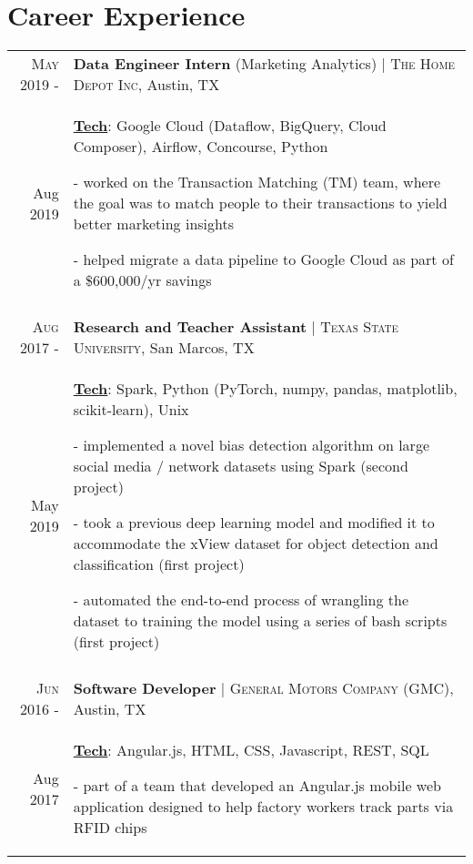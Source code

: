 \documentclass[a4paper,10pt]{article}
\begin{document}
\section{Career Experience}
\begin{tabular}{r|p{12cm}}

\textsc{May 2019 -} & \textbf{Data Engineer Intern} (Marketing Analytics) | \textsc{The Home Depot Inc}, Austin, TX \\
Aug 2019 & \small{
	\textbf{\underline{Tech}}: Google Cloud (Dataflow, BigQuery, Cloud Composer), Airflow, Concourse, Python}

	\tiny{
	\vphantom{a}
	}
	
	\small{
	- worked on the Transaction Matching (TM) team, where the goal was to match people to their transactions to yield better marketing insights
	
	- helped migrate a data pipeline to Google Cloud as part of a \$600,000/yr savings } \\
 \multicolumn{2}{c}{} \\

\textsc{Aug 2017 -} & \textbf{Research and Teacher Assistant} | \textsc{Texas State University}, San Marcos, TX \\
May 2019 & \small{
	\textbf{\underline{Tech}}: Spark, Python (PyTorch, numpy, pandas, matplotlib, scikit-learn), Unix
	}

	\tiny{
	\vphantom{a}
	}

	\small{
	
	- implemented a novel bias detection algorithm on large social media / network datasets using Spark (second project)
	
	- took a previous deep learning model and modified it to accommodate the xView dataset for object detection and classification (first project)
	
	- automated the end-to-end process of wrangling the dataset to training the model using a series of bash scripts (first project)
	}
	\\
 \multicolumn{2}{c}{} \\
 
 \textsc{Jun 2016 -} & \textbf{Software Developer} | \textsc{General Motors Company (GMC)}, Austin, TX \\
Aug 2017 & \small{
	\textbf{\underline{Tech}}: Angular.js, HTML, CSS, Javascript, REST, SQL}

	\tiny{
	\vphantom{a}
	}
	
	\small{
	- part of a team that developed an Angular.js mobile web application designed to help factory workers track parts via RFID chips
	
}
\end{tabular}
\end{document}
